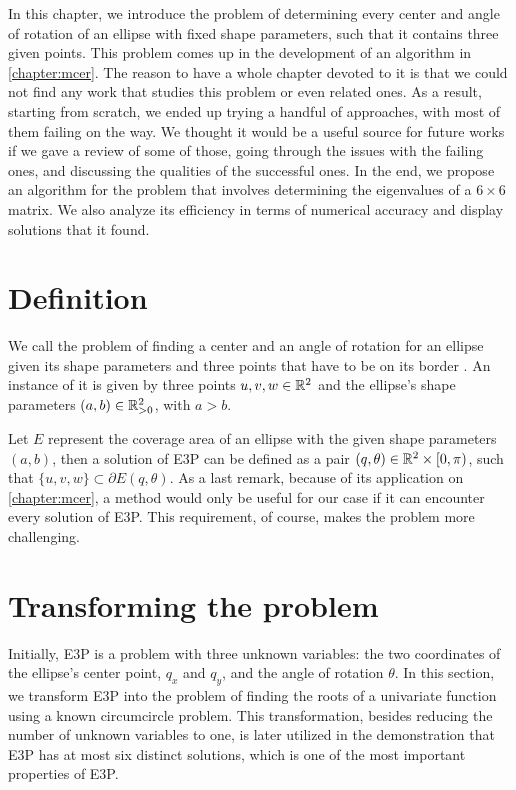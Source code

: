 In this chapter, we introduce the problem of determining every center and angle of rotation of an ellipse with fixed shape parameters, such that it contains three given points.
This problem comes up in the development of an algorithm in \autoref{chapter:mcer}. The reason to have a whole chapter devoted to it is that we could not find any work that studies this problem or even related ones.
As a result, starting from scratch, we ended up trying a handful of approaches, with most of them failing on the way. 
We thought it would be a useful source for future works if we gave a review of some of those, going through the issues with the failing ones, and discussing the qualities of the successful ones. 
In the end, we propose an algorithm for the problem that involves determining the eigenvalues of a $6\times6$ matrix. We also analyze its efficiency in terms of numerical accuracy and display solutions that it found.




\section{Definition}

We call the problem of finding a center and an angle of rotation for an ellipse given its shape parameters and three points that have to be on its border . An instance of it is given by three points $u, v, w \in \mathbb{R}^2$ and the ellipse's shape parameters $(a, b) \in \mathbb{R}^2_{>0}$, with $a > b$.

Let $E$ represent the coverage area of an ellipse with the given shape parameters $(a, b)$, then a solution of E3P can be defined as a pair $(q, \theta) \in \mathbb{R}^2\times[0, \pi)$, such that $\{u, v, w\} \subset \partial E(q, \theta)$. As a last remark, because of its application on \autoref{chapter:mcer}, a method would only be useful for our case if it can encounter every solution of E3P. This requirement, of course, makes the problem more challenging.

\section{Transforming the problem}

Initially, E3P is a problem with three unknown variables: the two coordinates of the ellipse's center point, $q_x$ and $q_y$, and the angle of rotation $\theta$. In this section, we transform E3P into the problem of finding the roots of a univariate function using a known circumcircle problem. 
This transformation, besides reducing the number of unknown variables to one, is later utilized in the demonstration that E3P has at most six distinct solutions, which is one of the most important properties of E3P.

